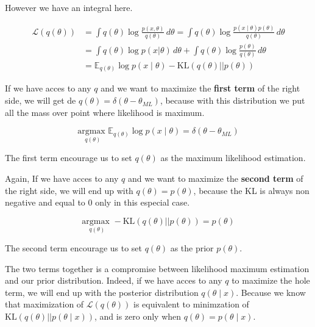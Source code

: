 \vspace{0.3cm}

However we have an integral here. 

\begin{equation}
 \begin{split}
  \mathcal{L}(q(\theta)) & = \int q(\theta) \log \frac{p(x,\theta)}{q(\theta)} \, d\theta = \int q(\theta) \log \frac{p(x\mid \theta)p(\theta)}{q(\theta)} \, d\theta \\
  & = \int q(\theta) \log p(x|\theta) \, d\theta + \int q(\theta) \log \frac{p(\theta)}{q(\theta)} \, d\theta  \\
  & = \mathbb{E}_{q(\theta)} \log p(x \mid \theta) - \text{KL}(q(\theta)||p(\theta))
 \end{split}
\end{equation}

If we have acces to any $q$ and we want to maximize the \textbf{first term} of the right side, we will get de $q(\theta) = \delta(\theta - \theta_{ML})$, because with this distribution we put all the mass over point where likelihood is maximum.

\begin{equation}
  \underset{q(\theta)}{\text{argmax }} \mathbb{E}_{q(\theta)} \log p(x \mid \theta) = \delta(\theta - \theta_{ML})
\end{equation}
 
The first term encourage us to set $q(\theta)$ as the maximum likelihood estimation.

\vspace{0.3cm}

Again, If we have acces to any $q$ and we want to maximize the \textbf{second term} of the right side, we will end up with $q(\theta) = p(\theta)$, because the KL is always non negative and equal to 0 only in this especial case.

\begin{equation}
  \underset{q(\theta)}{\text{argmax }} - \text{KL}(q(\theta)||p(\theta)) = p(\theta)
\end{equation}

The second term encourage us to set $q(\theta)$ as the prior $p(\theta)$.

\vspace{0.3cm}

The two terms together is a compromise between likelihood maximum estimation and our prior distribution.
Indeed, if we have acces to any $q$ to maximize the hole term, we will end up with the posterior distribution $q(\theta \mid x)$.
Because we know that maximization of $\mathcal{L}(q(\theta))$ is equivalent to minimzation of $\text{KL}(q(\theta)||p(\theta\mid x))$, and is zero only when $q(\theta) = p(\theta \mid x)$.

